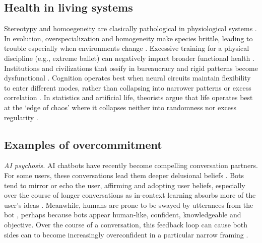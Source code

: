 
\subsection{Health in living systems}

Stereotypy and homoegeneity are clasically pathological in physiological systems \citep{canguilhem1966normal, lipsitz1992loss, mackey1977oscillation, sterling1988allostasis}. In evolution, overspecialization and homogeneity make species brittle, leading to trouble especially when environments change \citep{van2004cope, simpson1944tempo, yachi1999biodiversity}. Excessive training for a physical discipline (e.g., extreme ballet) can negatively impact broader functional health \citep{jayanthi2013sports, warren1986scoliosis}. Institutions and civilizations that ossify in bureaucracy and rigid patterns become dysfunctional \citep{weber1905protestantische, merton1940bureaucratic, olson1982rise}. Cognition operates best when neural circuits maintain flexibility to enter different modes, rather than collapsing into narrower patterns or excess correlation \citep{deco2012ongoing, waschke2021behavior, hellyer2015cognitive}. In statistics and artificial life, theorists argue that life operates best at the `edge of chaos' where it collapses neither into randomness nor excess regularity \citep{langton1990computation, gell1994quark, crutchfield1994calculi}. 

\subsection{Examples of overcommitment}


\textit{AI psychosis.} AI chatbots have recently become compelling conversation partners. For some users, these conversations lead them deeper delusional beliefs \citep{tiku2025psychosis, morrin2025delusions, ostergaard2025generative, yeung2025psychogenic}. Bots tend to mirror or echo the user, affirming and adopting user beliefs, especially over the course of longer conversations as in-context learning absorbs more of the user's ideas \citep{shanahan2023role, perez2022discovering, sharma2023sycophancy}. Meanwhile, humans are prone to be swayed by utterances from the bot \citep{costello2024durably, luettgau2025people, potter2024hidden}, perhaps because bots appear human-like, confident, knowledgeable and objective. Over the course of a conversation, this feedback loop can cause both sides can to become increasingly overconfident in a particular narrow framing \cite{dohnany2025technological}. 


